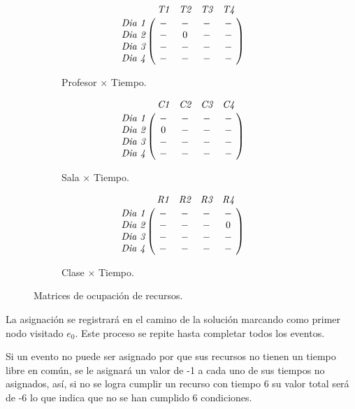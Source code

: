 \documentclass[letter, 10pt]{article}
\renewcommand{\it}[1]{\textit{#1}}
\begin{document}
\begin{figure}[htpb]
  \centering
  \begin{subfigure}[b]{.3\textwidth}
    \begin{equation*}
      \bordermatrix{
        ~          & \it{T1} & \it{T2} & \it{T3} & \it{T4} \cr
        \it{Dia 1} & -       & -       & -       & -       \cr
        \it{Dia 2} & -       & 0       & -       & -       \cr
        \it{Dia 3} & -       & -       & -       & -       \cr
        \it{Dia 4} & -       & -       & -       & -       \cr
      }
    \end{equation*}
    \caption{Profesor $\times$ Tiempo.}
    \label{fig:mt}
  \end{subfigure}
  \hspace{2mm}
  \begin{subfigure}[b]{.3\textwidth}
    \begin{equation*}
      \bordermatrix{
        ~          & \it{C1} & \it{C2} & \it{C3} & \it{C4} \cr
        \it{Dia 1} & -       & -       & -       & -       \cr
        \it{Dia 2} & 0       & -       & -       & -       \cr
        \it{Dia 3} & -       & -       & -       & -       \cr
        \it{Dia 4} & -       & -       & -       & -       \cr
      }
    \end{equation*}
    \caption{Sala $\times$ Tiempo.}
    \label{fig:mr}
  \end{subfigure}
  \hspace{2mm}
  \begin{subfigure}[b]{.3\textwidth}
    \begin{equation*}
      \bordermatrix{
        ~          & \it{R1} & \it{R2} & \it{R3} & \it{R4} \cr
        \it{Dia 1} & -       & -       & -       & -       \cr
        \it{Dia 2} & -       & -       & -       & 0       \cr
        \it{Dia 3} & -       & -       & -       & -       \cr
        \it{Dia 4} & -       & -       & -       & -       \cr
      }
    \end{equation*}
    \caption{Clase $\times$ Tiempo.}
    \label{fig:mc}
  \end{subfigure}
  \caption{Matrices de ocupación de recursos.}
  \label{fig:ex:tab}
\end{figure}

La asignación se registrará en el camino de la solución marcando como primer
nodo visitado $e_0$. Este proceso se repite hasta completar todos los eventos.

Si un evento no puede ser asignado por que sus recursos no tienen un tiempo
libre en común, se le asignará un valor de -1 a cada uno de sus tiempos no
asignados, así, si no se logra cumplir un recurso con tiempo 6 su valor total
será de -6 lo que indica que no se han cumplido 6 condiciones.
\end{document}
